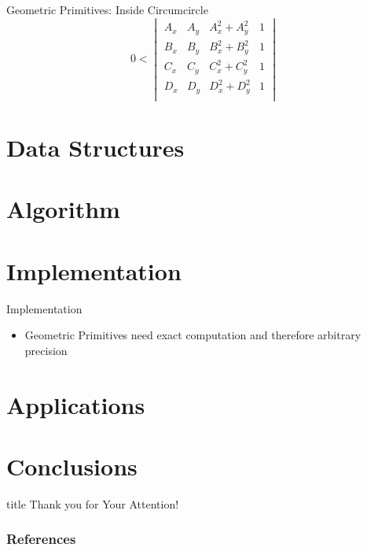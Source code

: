 \documentclass[aspectratio=169]{beamer}
\begin{document}
\begin{frame}{Geometric Primitives: Inside Circumcircle}
  \[
    0 <
    \begin{vmatrix}
      A_x & A_y & A_x^2 + A_y^2 & 1 \\
      B_x & B_y & B_x^2 + B_y^2 & 1 \\
      C_x & C_y & C_x^2 + C_y^2 & 1 \\
      D_x & D_y & D_x^2 + D_y^2 & 1 \\
    \end{vmatrix}
  \]
\end{frame}

\section{Data Structures}

\section{Algorithm}

\section{Implementation}
\begin{frame}{Implementation}
  \begin{itemize}
    \item Geometric Primitives need exact computation and therefore arbitrary precision
  \end{itemize}
\end{frame}

\section{Applications}

\section{Conclusions}

\begin{frame}
  \vfill
  \centering
  \begin{beamercolorbox}[sep=8pt,center,shadow=true,rounded=true]{title}
    Thank you for Your Attention!%
    \par%
  \end{beamercolorbox}
  \vfill
\end{frame}

\begin{frame}
  \frametitle{References}
  \AtNextBibliography{\tiny}
  \begin{multicols}{2}
    \nocite{*}
    \printbibliography
  \end{multicols}
\end{frame}
\end{document}
